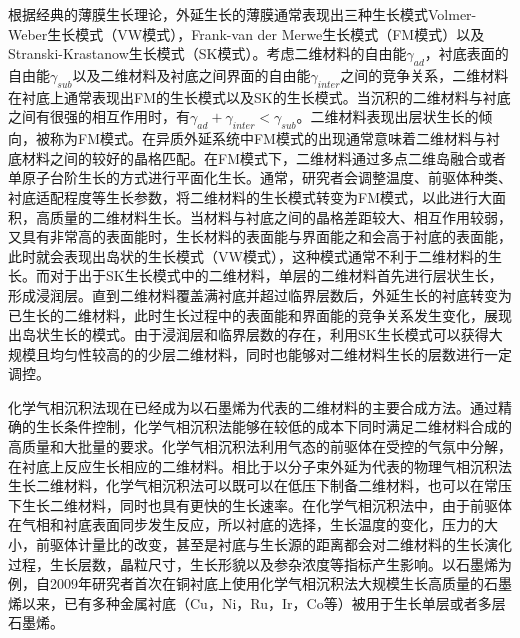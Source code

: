     根据经典的薄膜生长理论，外延生长的薄膜通常表现出三种生长模式\chinesecolon Volmer-Weber生长模式（VW模式），Frank-van der Merwe生长模式（FM模式）以及Stranski-Krastanow生长模式（SK模式）。考虑二维材料的自由能$\gamma_{ad}$，衬底表面的自由能$\gamma_{sub}$以及二维材料及衬底之间界面的自由能$\gamma_{inter}$之间的竞争关系，二维材料在衬底上通常表现出FM的生长模式以及SK的生长模式。当沉积的二维材料与衬底之间有很强的相互作用时，有$\gamma_{ad}+\gamma_{inter}<\gamma_{sub}$。二维材料表现出层状生长的倾向，被称为FM模式。在异质外延系统中FM模式的出现通常意味着二维材料与衬底材料之间的较好的晶格匹配。在FM模式下，二维材料通过多点二维岛融合或者单原子台阶生长的方式进行平面化生长。通常，研究者会调整温度、前驱体种类、衬底适配程度等生长参数，将二维材料的生长模式转变为FM模式，以此进行大面积，高质量的二维材料生长。当材料与衬底之间的晶格差距较大、相互作用较弱，又具有非常高的表面能时，生长材料的表面能与界面能之和会高于衬底的表面能，此时就会表现出岛状的生长模式（VW模式），这种模式通常不利于二维材料的生长。而对于出于SK生长模式中的二维材料，单层的二维材料首先进行层状生长，形成浸润层。直到二维材料覆盖满衬底并超过临界层数后，外延生长的衬底转变为已生长的二维材料，此时生长过程中的表面能和界面能的竞争关系发生变化，展现出岛状生长的模式。由于浸润层和临界层数的存在，利用SK生长模式可以获得大规模且均匀性较高的的少层二维材料，同时也能够对二维材料生长的层数进行一定调控。%

    化学气相沉积法现在已经成为以石墨烯为代表的二维材料的主要合成方法。通过精确的生长条件控制，化学气相沉积法能够在较低的成本下同时满足二维材料合成的高质量和大批量的要求。化学气相沉积法利用气态的前驱体在受控的气氛中分解，在衬底上反应生长相应的二维材料。相比于以分子束外延为代表的物理气相沉积法生长二维材料，化学气相沉积法可以既可以在低压下制备二维材料，也可以在常压下生长二维材料，同时也具有更快的生长速率。在化学气相沉积法中，由于前驱体在气相和衬底表面同步发生反应，所以衬底的选择，生长温度的变化，压力的大小，前驱体计量比的改变，甚至是衬底与生长源的距离都会对二维材料的生长演化过程，生长层数，晶粒尺寸，生长形貌以及参杂浓度等指标产生影响。以石墨烯为例，自2009年研究者首次在铜衬底上使用化学气相沉积法大规模生长高质量的石墨烯以来，已有多种金属衬底（Cu，Ni，Ru，Ir，Co等）被用于生长单层或者多层石墨烯。%

